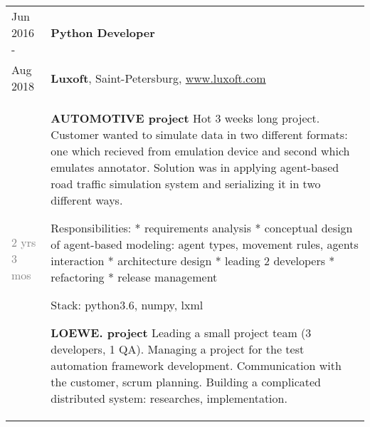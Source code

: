 \documentclass[a4paper,10pt]{article}
\begin{document}
\begin{tabularx}{\textwidth}{lX}
    Jun 2016 -              &   \textbf{Python Developer} \\
    Aug 2018                &   \textbf{Luxoft}, Saint-Petersburg,
                                \href{www.luxoft.com}{www.luxoft.com} \\
    \textcolor{gray}
    {2 yrs 3 mos}   
                            &   \footnotesize{

                                    \textbf{AUTOMOTIVE project}\newline
                                    Hot 3 weeks long project.\newline
                                    Customer wanted to simulate data in two different formats: one which recieved from emulation device and second which emulates annotator.\newline
                                    Solution was in applying agent-based road traffic simulation system and serializing it in two different ways.\newline
                                    
                                    Responsibilities:\newline
                                    * requirements analysis\newline
                                    * conceptual design of agent-based modeling: agent types, movement rules, agents interaction\newline
                                    * architecture design\newline
                                    * leading 2 developers\newline
                                    * refactoring\newline
                                    * release management\newline
                                    
                                    Stack: python3.6, numpy, lxml\newline\newline
                                    
                                    \textbf{LOEWE. project}\newline
                                    Leading a small project team (3 developers, 1 QA).\newline
                                    Managing a project for the test automation framework development.\newline
                                    Communication with the customer, scrum planning.\newline
                                    Building a complicated distributed system: researches, implementation.\newline
                                    
}
\end{tabularx}
\end{document}
